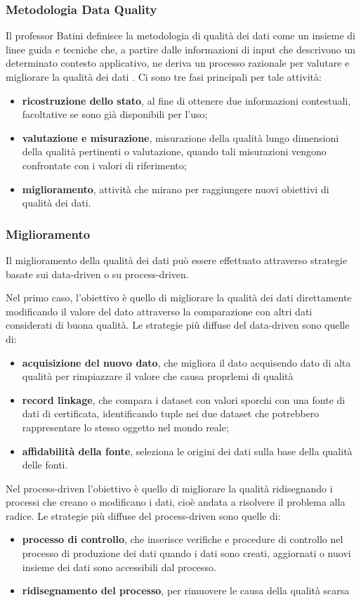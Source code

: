 \documentclass[a4paper,12pt]{article}
\begin{document}
\subsubsection{Metodologia Data Quality}

Il professor Batini definisce la metodologia di qualità dei dati come un insieme di linee guida e tecniche che, a partire dalle informazioni di input che descrivono un determinato contesto applicativo, ne deriva un processo razionale per valutare e migliorare la qualità dei dati \cite{10.1145/1541880.1541883}. Ci sono tre fasi principali per tale attività:
\begin{itemize}
\item \textbf{ricostruzione dello stato}, al fine di ottenere due informazioni contestuali, facoltative se sono già disponibili per l'uso;
\item \textbf{valutazione e misurazione}, misurazione della qualità lungo dimensioni della qualità pertinenti o valutazione, quando tali misurazioni vengono confrontate con i valori di riferimento;
\item \textbf{miglioramento}, attività che mirano per raggiungere nuovi obiettivi di qualità dei dati.
\end{itemize}

\subsubsection{Miglioramento}
Il miglioramento della qualità dei dati può essere effettuato attraverso strategie basate sui data-driven o su process-driven.

\noindent Nel primo caso, l'obiettivo è quello di migliorare la qualità dei dati direttamente modificando il valore del dato attraverso la comparazione con altri dati considerati di buona qualità. Le strategie più diffuse del data-driven sono quelle di: 
\begin{itemize}
	\item \textbf{acquisizione del nuovo dato}, che migliora il dato acquisendo dato di alta qualità per rimpiazzare il valore che causa proprlemi di qualità
	\item \textbf{record linkage}, che compara i dataset con valori sporchi con una fonte di dati di certificata, identificando tuple nei due dataset che potrebbero rappresentare lo stesso oggetto nel mondo reale;
	\item \textbf{affidabilità della fonte}, seleziona le origini dei dati sulla base della qualità delle fonti.
\end{itemize}
Nel process-driven l'obiettivo è quello di migliorare la qualità ridisegnando i processi che creano o modificano i dati, cioè andata a risolvere il problema alla radice. Le strategie più diffuse del process-driven sono quelle di: 
\begin{itemize}
	\item \textbf{processo di controllo}, che inserisce verifiche e procedure di controllo nel processo di produzione dei dati quando i dati sono creati, aggiornati o nuovi insieme dei dati sono accessibili dal processo.
	\item \textbf{ridisegnamento del processo}, per rimuovere le causa della qualità scarsa
\end{itemize}
\end{document}
